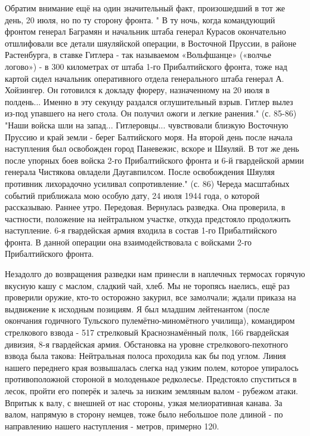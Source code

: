 \label{4-1}
Обратим внимание ещё на один значительный факт, произошедший в тот же день, 20 июля, но по ту сторону фронта. " В ту ночь, когда командующий фронтом генерал Баграмян и начальник штаба генерал Курасов окончательно отшлифовали все детали шяуляйской операции, в Восточной Пруссии, в районе Растенбурга, в ставке Гитлера - так называемом «Вольфшанце» («волчье логово») - в 300 километрах от штаба 1-го Прибалтийского фронта, тоже над картой сидел начальник оперативного отдела генерального штаба генерал А. Хойзингер. Он готовился к докладу фюреру, назначенному на 20 июля в полдень... Именно в эту секунду раздался оглушительный взрыв. Гитлер вылез из-под упавшего на него стола. Он получил ожоги и легкие ранения." (с. 85-86) "Наши войска шли на запад... Гитлеровцы... чувствовали близкую Восточную Пруссию и край земли - берег Балтийского моря. На второй день после начала наступления был освобожден город Паневежис, вскоре и Шяуляй. В тот же день после упорных боев войска 2-го Прибалтийского фронта и 6-й гвардейской армии генерала Чистякова овладели Даугавпилсом. После освобождения Шяуляя противник лихорадочно усиливал сопротивление." (с. 86) Череда масштабных событий приближала мою особую дату, 24 июля 1944 года, о которой рассказываю. 
Раннее утро. Передовая. Вернулась разведка. Она проверила, в частности, положение на нейтральном участке, откуда предстояло продолжить наступление. 6-я гвардейская армия входила в состав 1-го Прибалтийского фронта. В данной операции она взаимодействовала с войсками 2-го Прибалтийского фронта.

\label{5-1}
Незадолго до возвращения разведки нам принесли в наплечных термосах горячую вкусную кашу с маслом, сладкий чай, хлеб. Мы не торопясь наелись, ещё раз проверили оружие, кто-то осторожно закурил, все замолчали; ждали приказа на выдвижение к исходным позициям. Я был младшим лейтенантом (после окончания годичного Тульского пулемётно-миномётного училища), командиром стрелкового взвода - 517 стрелковый Краснознамённый полк, 166 гвардейская дивизия, 8-я гвардейская армия. Обстановка на уровне стрелкового-пехотного взвода была такова: Нейтральная полоса проходила как бы под углом. Линия нашего переднего края возвышалась слегка над узким полем, которое упиралось противоположной стороной в молоденькое редколесье. Предстояло спуститься в лесок, пройти его поперёк и залечь за низким земляным валом - рубежом атаки. Впритык к валу, с внешней от нас стороны, узкая мелиоративная канава. За валом, напрямую в сторону немцев, тоже было небольшое поле длиной - по направлению нашего наступления - метров, примерно 120.


